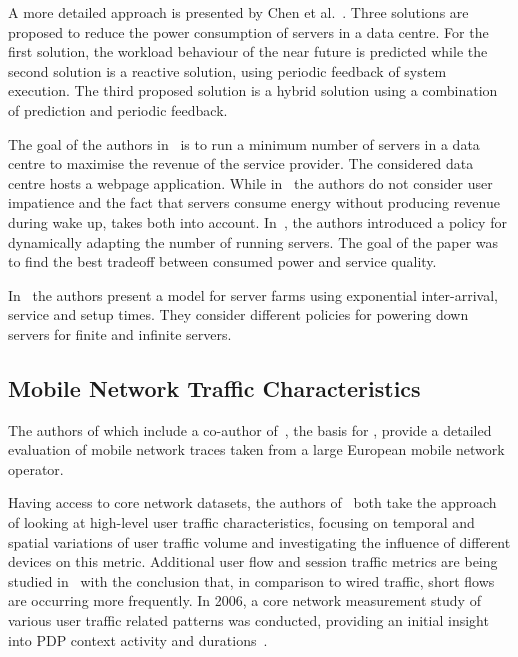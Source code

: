 A more detailed approach is presented by Chen et al.~\cite{Chen2005}. Three solutions are proposed to reduce the power consumption of servers in a data centre.
For the first solution, the workload behaviour of the near future is predicted while the second solution is a reactive solution, using periodic feedback of system execution.
The third proposed solution is a hybrid solution using a combination of prediction and periodic feedback.

The goal of the authors in~\cite{Mazzucco2010a, Dyachuk2010, Mazzucco2010b} is to run a minimum number of servers in a data centre to maximise the revenue of the service provider.
The considered data centre hosts a webpage application. While in~\cite{Mazzucco2010a} the authors do not consider user impatience and the fact that servers consume energy without producing revenue during wake up, \cite{Mazzucco2010b} takes both into account. In~\cite{Dyachuk2010}, the authors introduced a policy for dynamically adapting the number of running servers. The goal of the paper was to find the best tradeoff between consumed power and service quality.

In~\cite{Gandhi2010} the authors present a model for server farms using exponential inter-arrival, service and setup times. They consider different policies for powering down servers for finite and infinite servers. 


\subsection{Mobile Network Traffic Characteristics}
The authors of \cite{Metzger2014} which include a co-author of~\cite{Metzger2014a}, the basis for , provide a detailed evaluation of mobile network traces taken from a large European mobile network operator. 

Having access to core network datasets, the authors of~\cite{Shafiq2011, Paul2011} both take the approach of looking at high-level user traffic characteristics, focusing on temporal and spatial variations of user traffic volume and investigating the influence of different devices on this metric.
Additional user flow and session traffic metrics are being studied in~\cite{Zhang2012} with the conclusion that, in comparison to wired traffic, short flows are occurring more frequently.
In 2006, a core network measurement study of various user traffic related patterns was conducted, providing an initial insight into \gls{PDP} context activity and durations~\cite{Svoboda2006}.

